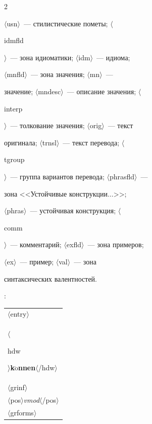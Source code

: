 \begin{multicols}{2}
{$\langle${\sf usn}$\rangle$~--- стилистические пометы; $\langle${\sf 


idmfld}$\rangle$~--- зона идиоматики; $\langle${\sf idm}$\rangle$~--- идиома; 


$\langle${\sf mnfld}$\rangle$~--- зона значения; $\langle${\sf mn}$\rangle$~--- 


значение; $\langle${\sf mndesc}$\rangle$~--- описание значения; $\langle${\sf 


interp}$\rangle$~--- толкование значения; $\langle${\sf orig}$\rangle$~--- текст 


оригинала; $\langle${\sf trnsl}$\rangle$~--- текст перевода; $\langle${\sf 


tgroup}$\rangle$~--- группа вариантов перевода; $\langle${\sf phrasfld}$\rangle$~---  


зона <<Устойчивые конструкции$\ldots$>>;


   $\langle${\sf phras}$\rangle$~--- устойчивая конструкция; $\langle${\sf 


comm}$\rangle$~--- комментарий; $\langle${\sf exfld}$\rangle$~--- зона примеров; 


$\langle${\sf ex}$\rangle$~--- пример; $\langle${\sf val}$\rangle$~--- зона 


синтаксических валентностей.}:










\noindent


  {\small 


  \begin{tabular}{l}


  $\langle${\sf entry}$\rangle$\\


  $\langle${\sf 


hdw}$\rangle$\textbf{k$\ddot{\mbox{o}}$nnen}$\langle$/{\sf hdw}$\rangle$


  \\


  $\langle${\sf grinf}$\rangle$\\


  \hspace*{3mm}$\langle${\sf pos}$\rangle$\textit{vmod}$\langle$/{\sf pos}$\rangle$\\


  \hspace*{3mm}$\langle${\sf grforms}$\rangle$\\



\end{tabular}}
\end{multicols}
